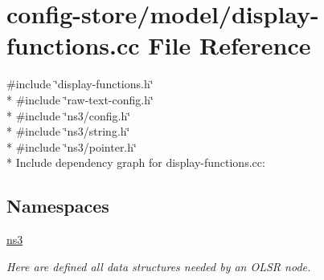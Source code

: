 \hypertarget{display-functions_8cc}{}\section{config-\/store/model/display-\/functions.cc File Reference}
\label{display-functions_8cc}
{\ttfamily \#include \char`\"{}display-\/functions.\+h\char`\"{}}\\*
{\ttfamily \#include \char`\"{}raw-\/text-\/config.\+h\char`\"{}}\\*
{\ttfamily \#include \char`\"{}ns3/config.\+h\char`\"{}}\\*
{\ttfamily \#include \char`\"{}ns3/string.\+h\char`\"{}}\\*
{\ttfamily \#include \char`\"{}ns3/pointer.\+h\char`\"{}}\\*
Include dependency graph for display-\/functions.cc\+:
\subsection*{Namespaces}
\begin{DoxyCompactItemize}
\item 
 \hyperlink{namespacens3}{ns3}
\begin{DoxyCompactList}\small\item\em Here are defined all data structures needed by an O\+L\+SR node. \end{DoxyCompactList}\end{DoxyCompactItemize}
